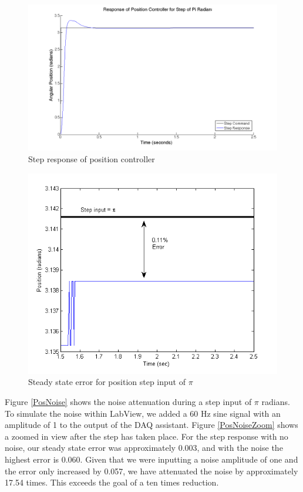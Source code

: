 \documentclass[letterpaper]{article}
\begin{document}
\begin{figure}[H]
\begin{center}
\includegraphics[scale=0.2]{posstep_1pi.png}
\caption{Step response of position controller}
\label{PosStepPi}
\end{center}
\end{figure}

\begin{figure}[H]
\begin{center}
\includegraphics[scale=0.5]{positionStepError.png}
\caption{Steady state error for position step input of $\pi$}
\label{PosStepError}
\end{center}
\end{figure}

Figure \ref{PosNoise} shows the noise attenuation during a step input of $\pi$ radians. To simulate the noise within LabView, we added a 60 Hz sine signal with an amplitude of 1 to the output of the DAQ assistant. Figure \ref{PosNoiseZoom} shows a zoomed in view after the step has taken place. For the step response with no noise, our steady state error was approximately 0.003, and with the noise the highest error is 0.060. Given that we were inputting a noise amplitude of one and the error only increased by 0.057, we have attenuated the noise by approximately 17.54 times. This exceeds the goal of a ten times reduction.\\
\end{document}
